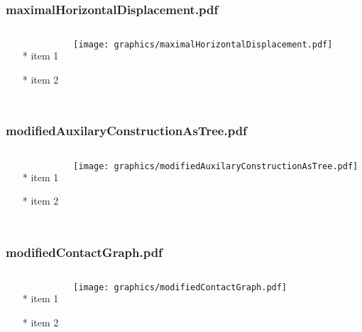 \documentclass{beamer}
\begin{document}
\begin{frame} \frametitle{maximalHorizontalDisplacement.pdf}
    \begin{columns}[c]
        \begin{itemize}
            \item[*] item 1
            \item[*] item 2
        \end{itemize}
        \begin{minipage}{\linewidth}
            \begin{center}
            \texttt{[image: graphics/maximalHorizontalDisplacement.pdf]}
            \label{gfx:maximalHorizontalDisplacement.pdf}
            \end{center}
        \end{minipage}
    \end{columns}
\end{frame}
\begin{frame} \frametitle{modifiedAuxilaryConstructionAsTree.pdf}
    \begin{columns}[c]
        \begin{itemize}
            \item[*] item 1
            \item[*] item 2
        \end{itemize}
        \begin{minipage}{\linewidth}
            \begin{center}
            \texttt{[image: graphics/modifiedAuxilaryConstructionAsTree.pdf]}
            \label{gfx:modifiedAuxilaryConstructionAsTree.pdf}
            \end{center}
        \end{minipage}
    \end{columns}
\end{frame}
\begin{frame} \frametitle{modifiedContactGraph.pdf}
    \begin{columns}[c]
        \begin{itemize}
            \item[*] item 1
            \item[*] item 2
        \end{itemize}
        \begin{minipage}{\linewidth}
            \begin{center}
            \texttt{[image: graphics/modifiedContactGraph.pdf]}
            \label{gfx:modifiedContactGraph.pdf}
            \end{center}
        \end{minipage}
    \end{columns}
\end{frame}
\end{document}
